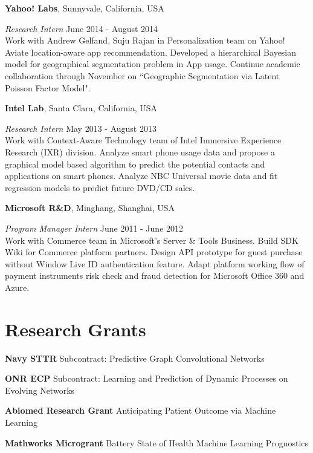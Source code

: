 \documentclass[margin,line]{res}
\begin{document}
\begin{resume}
{\bf  Yahoo! Labs}, Sunnyvale, California, USA

\vspace{-.3cm}
{\em Research Intern} \hfill { June 2014 - August 2014}\\ %
Work with Andrew Gelfand, Suju Rajan in Personalization team on Yahoo! Aviate location-aware app recommendation. Developed a hierarchical Bayesian model for geographical segmentation problem in App usage. Continue academic collaboration through November on ``Geographic Segmentation via Latent Poisson Factor Model".



{\bf  Intel Lab}, Santa Clara, California, USA

\vspace{-.3cm}
{\em Research Intern} \hfill{May 2013 - August 2013}\\ %
Work with Context-Aware Technology team of Intel Immersive Experience Research (IXR) division. 
Analyze smart phone usage data and propose a graphical model based algorithm to predict the potential contacts and applications on smart phones.
Analyze NBC Universal movie data and fit regression models to predict future DVD/CD sales.

{\bf  Microsoft R\&D}, Minghang, Shanghai, USA

\vspace{-.3cm}
{\em Program Manager Intern} \hfill {June  2011 
- June  2012}\\
 Work with Commerce team in Microsoft’s Server \& Tools Business.
 Build SDK Wiki for Commerce platform partners.  
 Design API prototype for guest purchase without Window Live ID authentication feature.
Adapt platform working flow of payment instruments risk check and fraud detection for Microsoft Office 360 and Azure.

\section{\sc Research Grants}
 
{\bf  Navy STTR} {Subcontract: Predictive Graph Convolutional Networks}

{\bf  ONR ECP} {Subcontract: Learning and Prediction of Dynamic Processes on Evolving Networks}

{\bf  Abiomed Research Grant}     {Anticipating Patient Outcome via Machine Learning} 

  {\bf  Mathworks Microgrant}     {Battery State of Health Machine Learning Prognostics} 
 

\end{resume}
\end{document}
